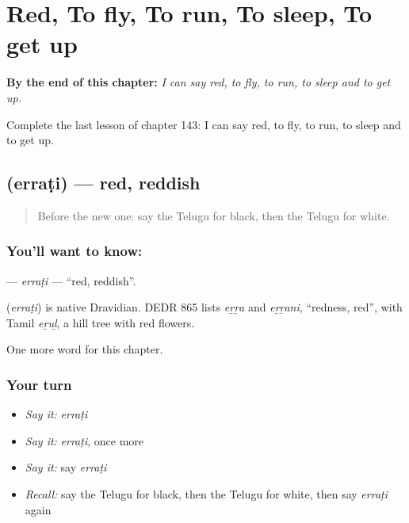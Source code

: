 
\chapter{Red, To fly, To run, To sleep, To get up}
\label{ch:te-red-to-fly-to-run-to-sleep-to-get-up}

\begin{chapteropening}
\textbf{By the end of this chapter:} \emph{I can say red, to fly, to run, to sleep and to get up.}

Complete the last lesson of chapter 143: I can say red, to fly, to run, to sleep and to get up.
\end{chapteropening}

\section[\texorpdfstring{\te{ఎర్రటి} (erraṭi)}{ఎర్రటి (erraṭi)}]{ (erraṭi) — red, reddish}

\label{lesson:TE-C143-errati}



\begin{quote}
Before the new one: say the Telugu for black, then the Telugu for white.
\end{quote}

\subsection*{You'll want to know: }
\textbf{} — \emph{erraṭi} — \textquotedblleft{}red, reddish\textquotedblright{}.

\begin{cousinweb}
\textbf{} (\emph{erraṭi}) is native Dravidian. DEDR 865 lists \emph{eṟṟa} and \emph{eṟṟani}, \textquotedblleft{}redness, red\textquotedblright{}, with Tamil \emph{eṟuḻ}, a hill tree with red flowers.
\end{cousinweb}

\begin{grammarlens}[title={What you've built}]
One more word for this chapter.
\end{grammarlens}

\subsection*{Your turn}
\begin{itemize}
\raggedright
  \item \emph{Say it:} \emph{erraṭi}
  \item \emph{Say it:} \emph{erraṭi}, once more
  \item \emph{Say it:} say \emph{erraṭi}
  \item \emph{Recall:} say the Telugu for black, then the Telugu for white, then say \emph{erraṭi} again
\end{itemize}


